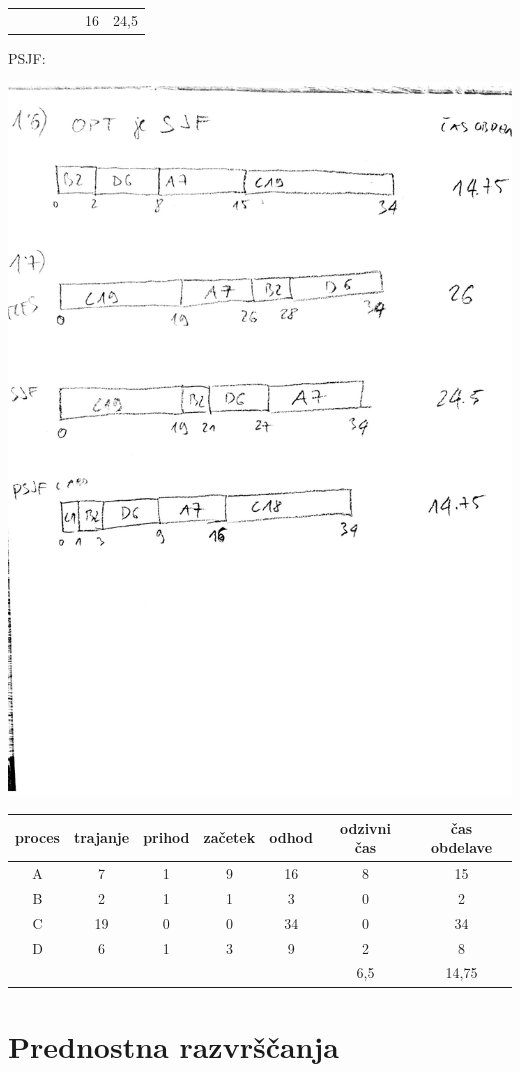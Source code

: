 {\begin{center}
\begin{tabular}{c|cc|cc|cc}
\hline
& & & & & 16 & 24,5
\end{tabular}
\end{center}
PSJF:
\begin{center}
\includegraphics[width=.9\textwidth]{razvrscanje/1.7-PSJF.pdf}\\
\begin{tabular}{c|cc|cc|cc}
proces & trajanje & prihod & začetek & odhod & odzivni čas & čas obdelave \\
\hline
A &   7 &  1 & 9 & 16 & 8 & 15 \\
B &   2 &  1 & 1  & 3 & 0 & 2 \\
C & 19 & 0 & 0 & 34 & 0 & 34 \\
D &   6 & 1 & 3 & 9 & 2 & 8 \\
\hline
& & & & & 6,5 & 14,75
\end{tabular}
\end{center}
}

\section{Prednostna razvrščanja}


